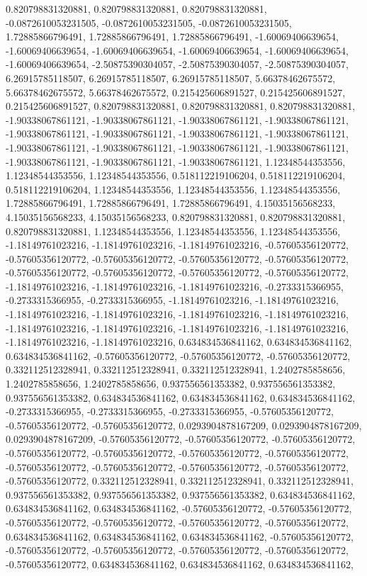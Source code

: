 \documentclass[
  ,man]{apa6}
\begin{document}
0.820798831320881, 0.820798831320881, 0.820798831320881, -0.0872610053231505, -0.0872610053231505, -0.0872610053231505, 1.72885866796491, 1.72885866796491, 1.72885866796491, -1.60069406639654, -1.60069406639654, -1.60069406639654, -1.60069406639654, -1.60069406639654, -1.60069406639654, -2.50875390304057, -2.50875390304057, -2.50875390304057, 6.26915785118507, 6.26915785118507, 6.26915785118507, 5.66378462675572, 5.66378462675572, 5.66378462675572, 0.215425606891527, 0.215425606891527, 0.215425606891527,
0.820798831320881, 0.820798831320881, 0.820798831320881, -1.90338067861121, -1.90338067861121, -1.90338067861121, -1.90338067861121, -1.90338067861121, -1.90338067861121, -1.90338067861121, -1.90338067861121, -1.90338067861121, -1.90338067861121, -1.90338067861121, -1.90338067861121, -1.90338067861121, -1.90338067861121, -1.90338067861121, 1.12348544353556, 1.12348544353556, 1.12348544353556, 0.518112219106204, 0.518112219106204, 0.518112219106204, 1.12348544353556, 1.12348544353556, 1.12348544353556,
1.72885866796491, 1.72885866796491, 1.72885866796491, 4.15035156568233, 4.15035156568233, 4.15035156568233, 0.820798831320881, 0.820798831320881, 0.820798831320881, 1.12348544353556, 1.12348544353556, 1.12348544353556, -1.18149761023216, -1.18149761023216, -1.18149761023216, -0.57605356120772, -0.57605356120772, -0.57605356120772, -0.57605356120772, -0.57605356120772, -0.57605356120772, -0.57605356120772, -0.57605356120772, -0.57605356120772, -1.18149761023216, -1.18149761023216, -1.18149761023216,
-0.2733315366955, -0.2733315366955, -0.2733315366955, -1.18149761023216, -1.18149761023216, -1.18149761023216, -1.18149761023216, -1.18149761023216, -1.18149761023216, -1.18149761023216, -1.18149761023216, -1.18149761023216, -1.18149761023216, -1.18149761023216, -1.18149761023216, 0.634834536841162, 0.634834536841162, 0.634834536841162, -0.57605356120772, -0.57605356120772, -0.57605356120772, 0.332112512328941, 0.332112512328941, 0.332112512328941, 1.2402785858656, 1.2402785858656, 1.2402785858656,
0.937556561353382, 0.937556561353382, 0.937556561353382, 0.634834536841162, 0.634834536841162, 0.634834536841162, -0.2733315366955, -0.2733315366955, -0.2733315366955, -0.57605356120772, -0.57605356120772, -0.57605356120772, 0.0293904878167209, 0.0293904878167209, 0.0293904878167209, -0.57605356120772, -0.57605356120772, -0.57605356120772, -0.57605356120772, -0.57605356120772, -0.57605356120772, -0.57605356120772, -0.57605356120772, -0.57605356120772, -0.57605356120772, -0.57605356120772, -0.57605356120772,
0.332112512328941, 0.332112512328941, 0.332112512328941, 0.937556561353382, 0.937556561353382, 0.937556561353382, 0.634834536841162, 0.634834536841162, 0.634834536841162, -0.57605356120772, -0.57605356120772, -0.57605356120772, -0.57605356120772, -0.57605356120772, -0.57605356120772, 0.634834536841162, 0.634834536841162, 0.634834536841162, -0.57605356120772, -0.57605356120772, -0.57605356120772, -0.57605356120772, -0.57605356120772, -0.57605356120772, 0.634834536841162, 0.634834536841162, 0.634834536841162,
\end{document}
